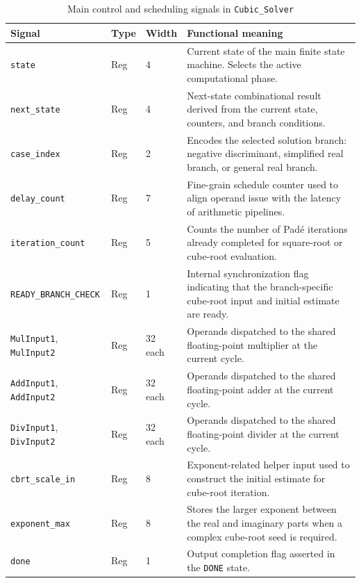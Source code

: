\begin{table}[H]
\centering
\caption{Main control and scheduling signals in \texttt{Cubic\_Solver}}
\label{tab:control_signals}
\renewcommand{\arraystretch}{1.2}
\begin{tabular}{p{3.0cm} p{2.0cm} p{1.4cm} p{8.0cm}}
\toprule
\textbf{Signal} & \textbf{Type} & \textbf{Width} & \textbf{Functional meaning} \\
\midrule
\texttt{state} & Reg & 4 & Current state of the main finite state machine. Selects the active computational phase. \\
\texttt{next\_state} & Reg & 4 & Next-state combinational result derived from the current state, counters, and branch conditions. \\
\texttt{case\_index} & Reg & 2 & Encodes the selected solution branch: negative discriminant, simplified real branch, or general real branch. \\
\texttt{delay\_count} & Reg & 7 & Fine-grain schedule counter used to align operand issue with the latency of arithmetic pipelines. \\
\texttt{iteration\_count} & Reg & 5 & Counts the number of Pad\'e iterations already completed for square-root or cube-root evaluation. \\
\texttt{READY\_BRANCH\_CHECK} & Reg & 1 & Internal synchronization flag indicating that the branch-specific cube-root input and initial estimate are ready. \\
\texttt{MulInput1}, \texttt{MulInput2} & Reg & 32 each & Operands dispatched to the shared floating-point multiplier at the current cycle. \\
\texttt{AddInput1}, \texttt{AddInput2} & Reg & 32 each & Operands dispatched to the shared floating-point adder at the current cycle. \\
\texttt{DivInput1}, \texttt{DivInput2} & Reg & 32 each & Operands dispatched to the shared floating-point divider at the current cycle. \\
\texttt{cbrt\_scale\_in} & Reg & 8 & Exponent-related helper input used to construct the initial estimate for cube-root iteration. \\
\texttt{exponent\_max} & Reg & 8 & Stores the larger exponent between the real and imaginary parts when a complex cube-root seed is required. \\
\texttt{done} & Reg & 1 & Output completion flag asserted in the \texttt{DONE} state. \\
\bottomrule
\end{tabular}
\end{table}

